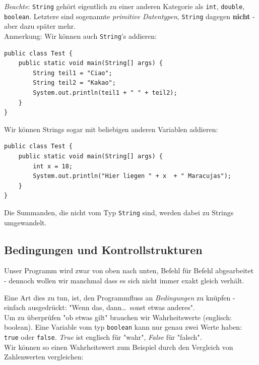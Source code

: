 \documentclass[ngerman,11pt]{article}
\begin{document}
    \textit{Beachte}: \lstinline{String} gehört eigentlich zu einer anderen Kategorie als \lstinline{int}, \lstinline{double}, \lstinline{boolean}.
    Letztere sind sogenannte \textit{primitive Datentypen}, \lstinline{String} dagegen \textbf{nicht} - aber dazu später mehr. \\

    Anmerkung: Wir können auch \lstinline{String}'s addieren:

    \begin{lstlisting}[caption=Strings addieren]
public class Test {
    public static void main(String[] args) {
        String teil1 = "Ciao";
        String teil2 = "Kakao";
        System.out.println(teil1 + " " + teil2);
    }
}
    \end{lstlisting}

    Wir können Strings sogar mit beliebigen anderen Variablen addieren:

    \begin{lstlisting}[caption=String + Zahl]
public class Test {
    public static void main(String[] args) {
        int x = 18;
        System.out.println("Hier liegen " + x  + " Maracujas");
    }
}
    \end{lstlisting}

    Die Summanden, die nicht vom Typ \lstinline{String} sind, werden dabei zu Strings umgewandelt.

    \subsection{Bedingungen und Kontrollstrukturen}

    Unser Programm wird zwar von oben nach unten, Befehl für Befehl abgearbeitet - dennoch wollen
    wir manchmal dass es sich nicht immer exakt gleich verhält.

    Eine Art dies zu tun, ist, den Programmfluss an \textit{Bedingungen} zu knüpfen - einfach ausgedrückt:
    "Wenn das, dann\dots\ sonst etwas anderes". \\

    Um zu überprüfen "ob etwas gilt" brauchen wir Wahrheitswerte (englisch: boolean).
    Eine Variable vom typ \lstinline{boolean} kann nur genau zwei Werte haben: \lstinline{true} oder \lstinline{false}.
    \textit{True} ist englisch für "wahr", \textit{False} für "falsch".\\

    Wir können so einen Wahrheitswert zum Beispiel durch den Vergleich von Zahlenwerten vergleichen:
\end{document}
